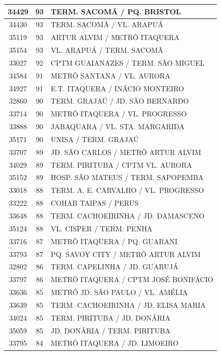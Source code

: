 \documentclass[
	12pt,				%
	oneside,			%
	a4paper,			%
	english,			%
	brazil				%
	]{abntex2ppgsi}
\begin{document}
{{\begin{apendicesenv}
\begin{longtable}{c|c|p{7cm}}
 \hline 
34429 &	93 &	TERM. SACOMÃ / PQ. BRISTOL \\ 
 \hline 
34430 &	93 &	TERM. SACOMÃ / VL. ARAPUÁ \\ 
 \hline 
35119 &	93 &	ARTUR ALVIM / METRÔ ITAQUERA \\ 
 \hline 
35154 &	93 &	VL. ARAPUÁ / TERM. SACOMÃ \\ 
 \hline 
33027 &	92 &	CPTM GUAIANAZES / TERM. SÃO MIGUEL \\ 
 \hline 
34584 &	91 &	METRÔ SANTANA / VL. AURORA \\ 
 \hline 
34927 &	91 &	E.T. ITAQUERA / INÁCIO MONTEIRO \\ 
 \hline 
32860 &	90 &	TERM. GRAJAÚ / JD. SÃO BERNARDO \\ 
 \hline 
33714 &	90 &	METRÔ ITAQUERA / VL. PROGRESSO \\ 
 \hline 
33888 &	90 &	JABAQUARA / VL. STA. MARGARIDA \\ 
 \hline 
35171 &	90 &	UNISA / TERM. GRAJAÚ \\ 
 \hline 
33707 &	89 &	JD. SÃO CARLOS / METRÔ ARTUR ALVIM \\ 
 \hline 
34029 &	89 &	TERM. PIRITUBA / CPTM VL. AURORA \\ 
 \hline 
35152 &	89 &	HOSP. SÃO MATEUS / TERM. SAPOPEMBA \\ 
 \hline 
33018 &	88 &	TERM. A. E. CARVALHO / VL. PROGRESSO \\ 
 \hline 
33222 &	88 &	COHAB TAIPAS / PERUS \\ 
 \hline 
33648 &	88 &	TERM. CACHOEIRINHA / JD. DAMASCENO \\ 
 \hline 
35124 &	88 &	VL. CISPER / TERM. PENHA \\ 
 \hline 
33716 &	87 &	METRÔ ITAQUERA / PQ. GUARANI \\ 
 \hline 
33793 &	87 &	PQ. SAVOY CITY / METRÔ ARTUR ALVIM \\ 
 \hline 
32802 &	86 &	TERM. CAPELINHA / JD. GUARUJÁ \\ 
 \hline 
33797 &	86 &	METRÔ ITAQUERA / CPTM JOSÉ BONIFÁCIO \\ 
 \hline 
33636 &	85 &	METRÔ JD. SÃO PAULO / VL. AMÉLIA \\ 
 \hline 
33639 &	85 &	TERM. CACHOEIRINHA / JD. ELISA MARIA \\ 
 \hline 
34024 &	85 &	TERM. PIRITUBA / JD. DONÁRIA \\ 
 \hline 
35059 &	85 &	JD. DONÁRIA / TERM. PIRITUBA \\ 
 \hline 
33795 &	84 &	METRÔ ITAQUERA / JD. LIMOEIRO \\ 

\end{longtable}
\end{apendicesenv}}}
\end{document}
